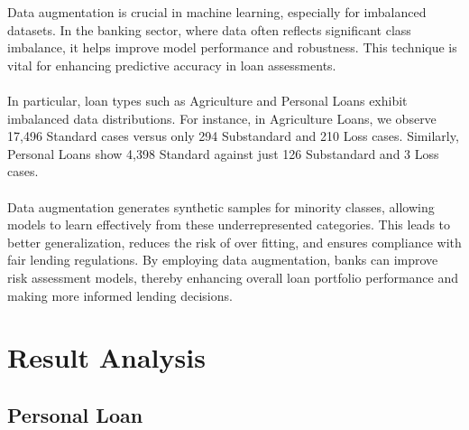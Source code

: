 \documentclass[a4paper]{article}
\begin{document}
Data augmentation is crucial in machine learning, especially for imbalanced datasets. In the banking sector, where data often reflects significant class imbalance, it helps improve model performance and robustness. This technique is vital for enhancing predictive accuracy in loan assessments\cite{Mahbobi2023}. \\\\ In particular, loan types such as Agriculture and Personal Loans exhibit imbalanced data distributions. For instance, in Agriculture Loans, we observe 17,496 Standard cases versus only 294 Substandard and 210 Loss cases. Similarly, Personal Loans show 4,398 Standard against just 126 Substandard and 3 Loss cases. \\\\ Data augmentation generates synthetic samples for minority classes, allowing models to learn effectively from these underrepresented categories. This leads to better generalization, reduces the risk of over fitting, and ensures compliance with fair lending regulations. By employing data augmentation, banks can improve risk assessment models, thereby enhancing overall loan portfolio performance and making more informed lending decisions\cite{li2021}.

\section{Result Analysis}
\subsection{Personal Loan}
\end{document}
